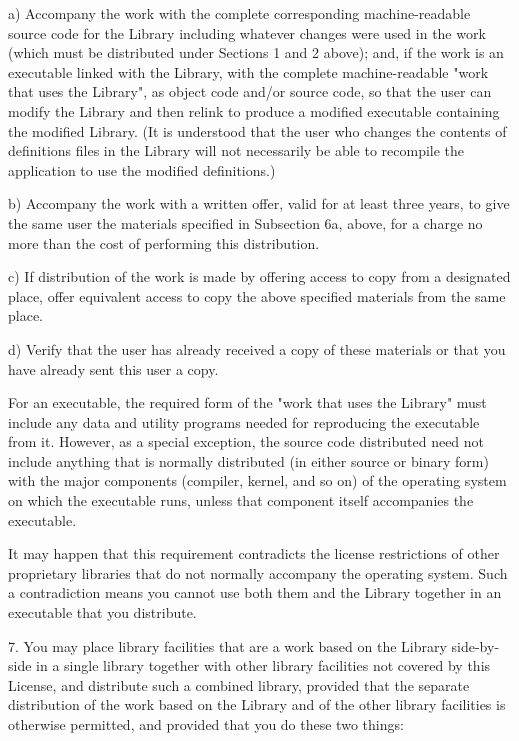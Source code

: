 \documentclass[a4paper,11pt]{report}
\begin{document}
\begin{indented}{1cm}
a) Accompany the work with the complete corresponding
machine-readable source code for the Library including whatever
changes were used in the work (which must be distributed under
Sections 1 and 2 above); and, if the work is an executable linked
with the Library, with the complete machine-readable "work that
uses the Library", as object code and/or source code, so that the
user can modify the Library and then relink to produce a modified
executable containing the modified Library. (It is understood
that the user who changes the contents of definitions files in the
Library will not necessarily be able to recompile the application
to use the modified definitions.)

b) Accompany the work with a written offer, valid for at
least three years, to give the same user the materials
specified in Subsection 6a, above, for a charge no more
than the cost of performing this distribution.

c) If distribution of the work is made by offering access to copy
from a designated place, offer equivalent access to copy the above
specified materials from the same place.

d) Verify that the user has already received a copy of these
materials or that you have already sent this user a copy.
\end{indented}

For an executable, the required form of the "work that uses the
Library" must include any data and utility programs needed for
reproducing the executable from it. However, as a special exception,
the source code distributed need not include anything that is normally
distributed (in either source or binary form) with the major
components (compiler, kernel, and so on) of the operating system on
which the executable runs, unless that component itself accompanies
the executable.

It may happen that this requirement contradicts the license
restrictions of other proprietary libraries that do not normally
accompany the operating system. Such a contradiction means you cannot
use both them and the Library together in an executable that you
distribute.

7. You may place library facilities that are a work based on the
Library side-by-side in a single library together with other library
facilities not covered by this License, and distribute such a combined
library, provided that the separate distribution of the work based on
the Library and of the other library facilities is otherwise
permitted, and provided that you do these two things:
\end{document}
